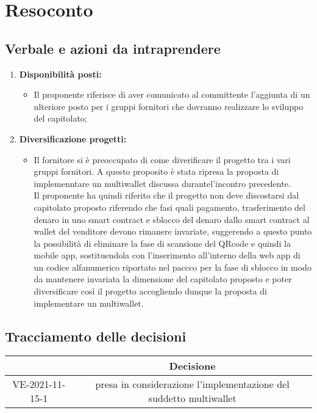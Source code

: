 \section{Resoconto}
\subsection{Verbale e azioni da intraprendere}

\begin{enumerate}
	\item \textbf{Disponibilità posti:}
	\begin{itemize}
		\item Il proponente riferisce di aver comunicato al committente l'aggiunta di un ulteriore posto per i gruppi fornitori che dovranno realizzare lo sviluppo del capitolato;
	\end{itemize}

	\item \textbf{Diversificazione progetti:}
	\begin{itemize}
		\item Il fornitore si è preoccupato di come diverificare il progetto tra i vari gruppi fornitori.
		A questo proposito è stata ripresa la proposta di implemenntare un multiwallet discussa durantel'incontro precedente.\\
		Il proponente ha quindi riferito che il progetto non deve discostarsi dal capitolato proposto riferendo che fasi quali pagamento, trasferimento del denaro in uno smart contract e sblocco del denaro dallo smart contract al wallet del venditore devono rimanere invariate,
		suggerendo a questo punto la possibilità di eliminare la fase di scansione del QRcode e quindi la mobile app,
		sostituendola con l'inserimento all'interno della web app di un codice alfanumerico riportato nel paccco per la fase di sblocco
		in modo da mantenere invariata la dimensione del capitolato proposto e poter diversificare così il progetto
		accogliendo dunque la proposta di implementare un multiwallet.
	\end{itemize}

	

\end{enumerate}

\pagebreak

\subsection{Tracciamento delle decisioni}

\begin{table}[H]
	\centering
	\renewcommand{\arraystretch}{1.8}
	\begin{tabular}{c | c}
		\rowcolor[HTML]{125e28}
		\multicolumn{1}{c}{\color[HTML]{FFFFFF} \textbf{ID}} &
		\multicolumn{1}{c}{\color[HTML]{FFFFFF} \textbf{Decisione}} \\
		\hline
		VE-2021-11-15-1 & presa in considerazione l'implementazione del suddetto multiwallet\\ \hline

	\end{tabular}
\end{table}